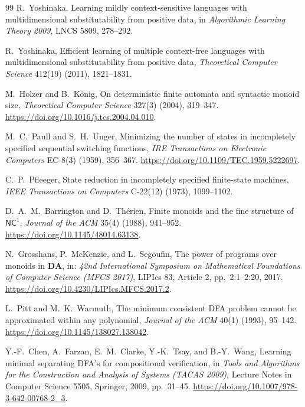 \documentclass[10pt,a4paper]{article}
\theoremstyle{definition}
\theoremstyle{remark}
\begin{document}
\begin{thebibliography}{99}
R.~Yoshinaka,
\newblock Learning mildly context-sensitive languages with multidimensional
substitutability from positive data,
\newblock in \emph{Algorithmic Learning Theory 2009}, LNCS 5809,
278--292.

R.~Yoshinaka,
\newblock Efficient learning of multiple context-free languages with
multidimensional substitutability from positive data,
\newblock \emph{Theoretical Computer Science} 412(19) (2011), 1821--1831.

M.~Holzer and B.~K{\"o}nig,
\newblock On deterministic finite automata and syntactic monoid size,
\newblock \emph{Theoretical Computer Science} 327(3) (2004), 319--347.
\newblock \url{https://doi.org/10.1016/j.tcs.2004.04.010}.

M.~C.~Paull and S.~H.~Unger,
\newblock Minimizing the number of states in incompletely specified sequential switching functions,
\newblock \emph{IRE Transactions on Electronic Computers} EC-8(3) (1959), 356--367.
\newblock \url{https://doi.org/10.1109/TEC.1959.5222697}.

C.~P.~Pfleeger,
\newblock State reduction in incompletely specified finite-state machines,
\newblock \emph{IEEE Transactions on Computers} C-22(12) (1973), 1099--1102.

D.~A.~M.~Barrington and D.~Th{\'e}rien,
\newblock Finite monoids and the fine structure of $\mathsf{NC}^{1}$,
\newblock \emph{Journal of the ACM} 35(4) (1988), 941--952.
\newblock \url{https://doi.org/10.1145/48014.63138}.

N.~Grosshans, P.~McKenzie, and L.~Segoufin,
\newblock The power of programs over monoids in $\mathbf{DA}$,
\newblock in: \emph{42nd International Symposium on Mathematical Foundations of Computer Science (MFCS 2017)},
LIPIcs 83, Article 2, pp.~2:1--2:20, 2017.
\newblock \url{https://doi.org/10.4230/LIPIcs.MFCS.2017.2}.


L.~Pitt and M.~K.~Warmuth,
\newblock The minimum consistent DFA problem cannot be approximated within any polynomial,
\newblock \emph{Journal of the ACM} 40(1) (1993), 95--142.
\newblock \url{https://doi.org/10.1145/138027.138042}.

Y.-F.~Chen, A.~Farzan, E.~M.~Clarke, Y.-K.~Tsay, and B.-Y.~Wang,
\newblock Learning minimal separating DFA's for compositional verification,
\newblock in \emph{Tools and Algorithms for the Construction and Analysis of
Systems (TACAS 2009)}, Lecture Notes in Computer Science 5505,
Springer, 2009, pp.~31--45.
\newblock \url{https://doi.org/10.1007/978-3-642-00768-2_3}.


\end{thebibliography}
\end{document}
